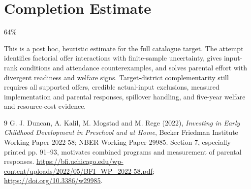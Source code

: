 \documentclass[11pt]{article}
\theoremstyle{remark}\newtheorem{remark}[theorem]{Remark}
\begin{document}
\section{Completion Estimate}
64\%

This is a post hoc, heuristic estimate for the full catalogue target.
The attempt identifies factorial offer interactions with finite-sample uncertainty, gives input-rank conditions and attendance counterexamples, and solves parental effort with divergent readiness and welfare signs. Target-district complementarity still requires all supported offers, credible actual-input exclusions, measured implementation and parental responses, spillover handling, and five-year welfare and resource-cost evidence.

\begin{thebibliography}{9}
 G. J. Duncan, A. Kalil, M. Mogstad and M. Rege (2022), \emph{Investing in Early Childhood Development in Preschool and at Home}, Becker Friedman Institute Working Paper 2022-58; NBER Working Paper 29985. Section 7, especially printed pp. 91--93, motivates combined programs and measurement of parental responses. \url{https://bfi.uchicago.edu/wp-content/uploads/2022/05/BFI_WP_2022-58.pdf}; \url{https://doi.org/10.3386/w29985}.
\end{thebibliography}
\end{document}

